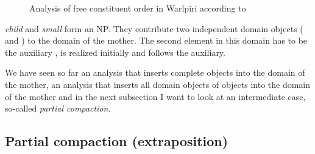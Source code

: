 \documentclass[output=paper]{langsci/langscibook}
\begin{document}
\begin{figure}
\caption{\label{fig-warlpiri}Analysis of free constituent order in Warlpiri according to \citet{DS99a}}
\end{figure}
\emph{child} and \emph{small} form an NP. They contribute two independent domain objects (
and ) to the domain of the mother. The second element in this domain has to be the auxiliary
,  is realized initially and  follows the auxiliary.

We have seen so far an analysis that inserts complete objects into the domain of the mother, an
analysis that inserts all domain objects of objects into the domain of the mother and in the next
subsection I want to look at an intermediate case, so-called \emph{partial compaction}.

\subsection{Partial compaction (extraposition)}
\label{sec-partial-compaction}
\end{document}
